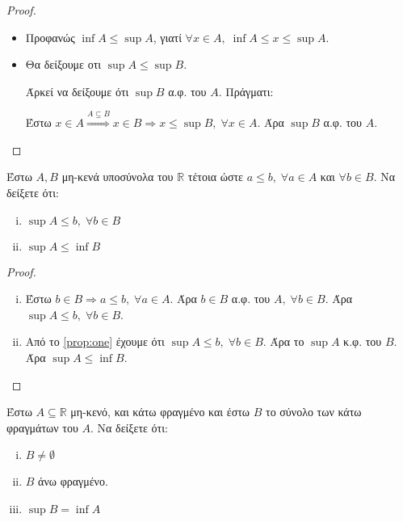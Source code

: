 \begin{multicols}{2}
\begin{enumerate}
\begin{proof}
\begin{itemize}
                    \item Προφανώς $ \inf A \leq \sup A $, γιατί $ \forall x \in A, \; 
                        \inf A \leq x \leq \sup A $.

                    \item Θα δείξουμε οτι $ \sup A \leq \sup B $. 

                        Άρκεί να δείξουμε ότι $ \sup B $ α.φ. του $A$. Πράγματι:

                        Έστω $ x \in A \overset{A \subseteq B}{\Rightarrow} x \in B \Rightarrow 
                        x \leq \sup B, \; \forall x \in A $.  Άρα $ \sup B $ α.φ. του $A$.
                \end{itemize}
            \end{proof}

        \item \textcolor{Col1}{Έστω $ A, B $ μη-κενά υποσύνολα του $ \mathbb{R} $ τέτοια ώστε 
                $ a \leq b, \; \forall a \in A $ και $ \forall b \in B $.
                Να δείξετε ότι:
                \begin{enumerate}[i)]
                    \item $ \sup A \leq b, \;  \forall b \in B $
                    \item $ \sup A \leq \inf B $
            \end{enumerate}}

            \begin{proof}
            \item {}
                \begin{enumerate}[i)]
                    \item \label{prop:one} Έστω $ b \in B \Rightarrow a \leq b, \; 
                        \forall a \in A $. 
                        Άρα $ b \in B $ α.φ. του $A, \; \forall b \in B$. Άρα 
                        $ \sup A \leq b, \; \forall b \in B $.

                    \item Από το \ref{prop:one} έχουμε ότι $ \sup A \leq b, \; \forall 
                        b \in B$. Άρα το $ \sup A $ κ.φ. του $B$. Άρα $ \sup A \leq 
                        \inf B$.
                \end{enumerate}
            \end{proof}

        \item \textcolor{Col1}{ Έστω $ A \subseteq \mathbb{R} $ μη-κενό, και κάτω φραγμένο και έστω 
                $ B $ το σύνολο των κάτω φραγμάτων του $A$. Να δείξετε ότι:
                \begin{enumerate}[i)]
                    \item $ B \neq \emptyset $
                    \item $B$ άνω φραγμένο.
                    \item $ \sup B = \inf A $
            \end{enumerate}}


\end{enumerate}
\end{multicols}
